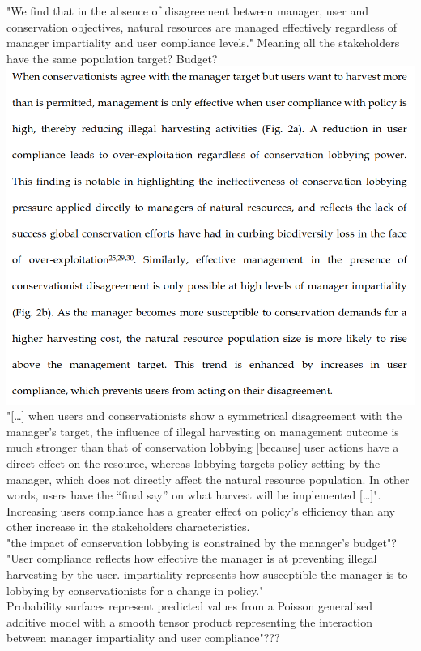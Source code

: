 \documentclass[12pt]{article}
\begin{document}
"We   find   that   in   the   absence   of   disagreement   between   manager,   user   and conservation  objectives,  natural  resources  are  managed  effectively  regardless  of manager   impartiality   and   user   compliance   levels." Meaning all the stakeholders have the same population target? Budget?\\
\includegraphics[scale=0.5]{cusack-results.png}\\
"[\dots] when  users  and  conservationists  show  a  symmetrical  disagreement  with  the manager’s  target,  the  influence  of  illegal  harvesting  on  management  outcome  is much stronger than  that of conservation lobbying [because] user actions  have  a  direct  effect  on  the  resource,  whereas  lobbying  targets  policy-setting by  the  manager,  which  does  not  directly  affect  the  natural  resource  population.  In other words, users have the “final say” on what harvest will be implemented [\dots]". Increasing users compliance has a greater effect on policy's efficiency than any other increase in the stakeholders characteristics.\\
"the impact of conservation lobbying is constrained by the  manager’s budget"?\\
"User compliance reflects how effective the manager is at preventing illegal harvesting by the user. impartiality represents how susceptible the manager is to lobbying by conservationists for a change in policy."\\
Probability  surfaces  represent  predicted values  from  a  Poisson  generalised  additive  model  with  a  smooth  tensor  product  representing  the interaction between manager impartiality and user compliance"???
\end{document}
